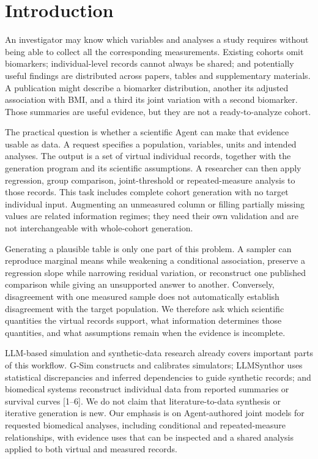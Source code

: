 \documentclass[11pt,letterpaper]{article}
\begin{document}

\section{Introduction}

An investigator may know which variables and analyses a study requires without being able to collect all the corresponding measurements. Existing cohorts omit biomarkers; individual-level records cannot always be shared; and potentially useful findings are distributed across papers, tables and supplementary materials. A publication might describe a biomarker distribution, another its adjusted association with BMI, and a third its joint variation with a second biomarker. Those summaries are useful evidence, but they are not a ready-to-analyze cohort.


The practical question is whether a scientific Agent can make that evidence usable as data. A request specifies a population, variables, units and intended analyses. The output is a set of virtual individual records, together with the generation program and its scientific assumptions. A researcher can then apply regression, group comparison, joint-threshold or repeated-measure analysis to those records. This task includes complete cohort generation with no target individual input. Augmenting an unmeasured column or filling partially missing values are related information regimes; they need their own validation and are not interchangeable with whole-cohort generation.


Generating a plausible table is only one part of this problem. A sampler can reproduce marginal means while weakening a conditional association, preserve a regression slope while narrowing residual variation, or reconstruct one published comparison while giving an unsupported answer to another. Conversely, disagreement with one measured sample does not automatically establish disagreement with the target population. We therefore ask which scientific quantities the virtual records support, what information determines those quantities, and what assumptions remain when the evidence is incomplete.


LLM-based simulation and synthetic-data research already covers important parts of this workflow. G-Sim constructs and calibrates simulators; LLMSynthor uses statistical discrepancies and inferred dependencies to guide synthetic records; and biomedical systems reconstruct individual data from reported summaries or survival curves [1–\allowbreak{}6]. We do not claim that literature-to-data synthesis or iterative generation is new. Our emphasis is on Agent-authored joint models for requested biomedical analyses, including conditional and repeated-measure relationships, with evidence uses that can be inspected and a shared analysis applied to both virtual and measured records.
\end{document}
